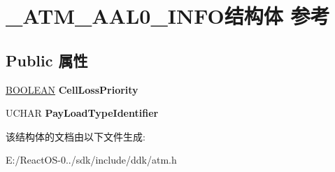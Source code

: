 \hypertarget{struct___a_t_m___a_a_l0___i_n_f_o}{}\section{\+\_\+\+A\+T\+M\+\_\+\+A\+A\+L0\+\_\+\+I\+N\+F\+O结构体 参考}
\label{struct___a_t_m___a_a_l0___i_n_f_o}
\subsection*{Public 属性}
\begin{DoxyCompactItemize}
\item 
\mbox{\label{struct___a_t_m___a_a_l0___i_n_f_o_a320ba1234e83da9ead8dd0958dd4b076}} 
\hyperlink{_processor_bind_8h_a112e3146cb38b6ee95e64d85842e380a}{B\+O\+O\+L\+E\+AN} {\bfseries Cell\+Loss\+Priority}
\item 
\mbox{\label{struct___a_t_m___a_a_l0___i_n_f_o_a58588ebc829b744973d4761648bcc182}} 
U\+C\+H\+AR {\bfseries Pay\+Load\+Type\+Identifier}
\end{DoxyCompactItemize}


该结构体的文档由以下文件生成\+:\begin{DoxyCompactItemize}
\item 
E\+:/\+React\+O\+S-\/0../sdk/include/ddk/atm.\+h\end{DoxyCompactItemize}
